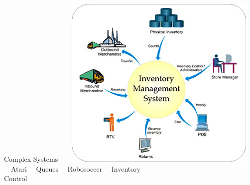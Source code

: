 \documentclass[10pt,handout]{beamer}
\begin{document}
\begin{frame}[fragile]{Complex Systems}
$\mbox{ }$$\mbox{ }$
\includegraphics[scale=0.125]{invent.jpeg}
$\mbox{ }$\\
$\mbox{ }$
\quad Atari\quad\quad\quad\quad
$\mbox{ }$
Queues\quad\quad\quad\quad
$\mbox{ }$
 Robosoccer\quad\quad
$\mbox{ }$
Inventory
$\mbox{ }$\\
\quad\quad\quad\quad\quad\quad\quad
\quad\quad\quad\quad\quad\quad\quad
\quad\quad\quad\quad\quad\quad\quad
\quad\quad\quad
Control

\end{frame}


\begin{comment}


\begin{frame}[fragile]{What? and What not?}

\begin{block}{What not?}
\begin{itemize}
\item Sequence $\neq$ Data Stream
\item Decisions are not right/wrong (no labels)
\end{itemize}
\end{block}

\begin{block}{What?}
\begin{itemize}
\item Stochastic Dynamical system
\item Decisions affects evolution
\end{itemize}

\end{block}
\begin{block}{Aim}
\centering Take {\color{orange}{control}} of the system
\end{block}
\end{frame}
\end{comment}
\end{document}
